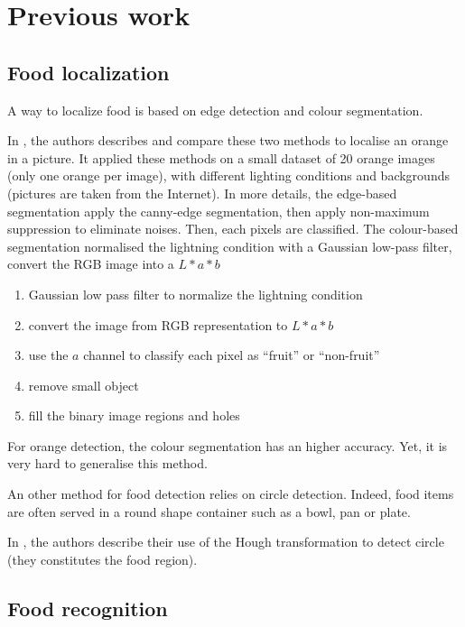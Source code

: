 \chapter{Previous work} \label{sec:previous_work}
\section{Food localization}


A way to localize food is based on edge detection and colour segmentation.

In \cite{Thendral2014a}, the authors describes and compare these two methods to localise an orange in a picture. It applied these methods on a small dataset of 20 orange images (only one orange per image), with different lighting conditions and backgrounds (pictures are taken from the Internet).
In more details, the edge-based segmentation apply the canny-edge segmentation, then apply non-maximum suppression to eliminate noises. Then, each pixels are classified.
The colour-based segmentation normalised the lightning condition with a Gaussian low-pass filter, convert the RGB image into a $L * a * b$
\begin{enumerate}
    \item Gaussian low pass filter to normalize the lightning condition
    \item convert the image from RGB representation to $L * a * b$
    \item use the $a$ channel to classify each pixel as \enquote{fruit} or \enquote{non-fruit}
    \item remove small object
    \item fill the binary image regions and holes
\end{enumerate}
For orange detection, the colour segmentation has an higher accuracy. Yet, it is very hard to generalise this method.


An other method for food detection relies on circle detection. Indeed, food items are often served in a round shape container such as a bowl, pan or plate.

In \cite{Wazumi2011}, the authors describe their use of the Hough transformation to detect circle (they constitutes the food region).


\section{Food recognition}

